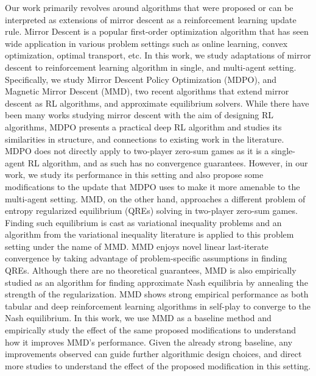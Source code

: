 Our work primarily revolves around algorithms that were proposed or can be interpreted as
extensions of mirror descent as a reinforcement learning update rule.
Mirror Descent is a popular first-order optimization algorithm that has seen wide application in
various problem settings such as online learning, convex optimization, optimal transport, etc. In
this work, we study adaptations of mirror descent to reinforcement learning algorithm in single,
and multi-agent setting.
Specifically, we study Mirror Descent Policy Optimization (MDPO), and Magnetic Mirror Descent
(MMD), two recent algorithms that extend mirror descent as RL algorithms, and approximate
equilibrium solvers.
While there have been many works studying mirror descent with the aim of designing RL algorithms,
MDPO presents a practical deep RL algorithm and studies its similarities in structure, and
connections to existing work in the literature.
MDPO does not directly apply to two-player zero-sum games as it is a single-agent RL algorithm, and
as such has no convergence guarantees.
However, in our work, we study its performance in this setting and also propose some modifications
to the update that MDPO uses to make it more amenable to the multi-agent setting.
MMD, on the other hand, approaches a different problem of entropy regularized equilibrium (QREs)
solving in two-player zero-sum games.
Finding such equilibrium is cast as variational inequality problems and an algorithm from the
variational inequality literature is applied to this problem setting under the name of MMD.
MMD enjoys novel linear last-iterate convergence by taking advantage of problem-specific
assumptions in finding QREs.
Although there are no theoretical guarantees, MMD is also empirically studied as an algorithm for
finding approximate Nash equilibria by annealing the strength of the regularization.
MMD shows strong empirical performance as both tabular and deep reinforcement learning algorithms
in self-play to converge to the Nash equilibrium.
In this work, we use MMD as a baseline method and empirically study the effect of the same proposed
modifications to understand how it improves MMD's performance.
Given the already strong baseline, any improvements observed can guide further algorithmic design
choices, and direct more studies to understand the effect of the proposed modification in this
setting.

